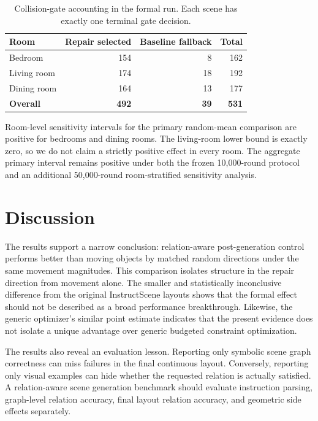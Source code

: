 \documentclass{article}
\begin{document}
\begin{table}[t]
\centering
\caption{Collision-gate accounting in the formal run. Each scene has exactly one terminal gate decision.}
\label{tab:gated}
\begin{tabular}{lrrr}
\toprule
Room & Repair selected & Baseline fallback & Total \\
\midrule
Bedroom & 154 & 8 & 162 \\
Living room & 174 & 18 & 192 \\
Dining room & 164 & 13 & 177 \\
\textbf{Overall} & \textbf{492} & \textbf{39} & \textbf{531} \\
\bottomrule
\end{tabular}
\end{table}

Room-level sensitivity intervals for the primary random-mean comparison are positive for bedrooms and dining rooms. The living-room lower bound is exactly zero, so we do not claim a strictly positive effect in every room. The aggregate primary interval remains positive under both the frozen 10,000-round protocol and an additional 50,000-round room-stratified sensitivity analysis.

\section{Discussion}

The results support a narrow conclusion: relation-aware post-generation control performs better than moving objects by matched random directions under the same movement magnitudes. This comparison isolates structure in the repair direction from movement alone. The smaller and statistically inconclusive difference from the original InstructScene layouts shows that the formal effect should not be described as a broad performance breakthrough. Likewise, the generic optimizer's similar point estimate indicates that the present evidence does not isolate a unique advantage over generic budgeted constraint optimization.

The results also reveal an evaluation lesson. Reporting only symbolic scene graph correctness can miss failures in the final continuous layout. Conversely, reporting only visual examples can hide whether the requested relation is actually satisfied. A relation-aware scene generation benchmark should evaluate instruction parsing, graph-level relation accuracy, final layout relation accuracy, and geometric side effects separately.
\end{document}
